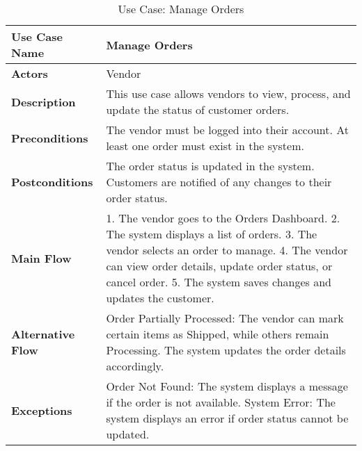 \begin{table}[h]
\centering
\begin{tabular}{|p{3cm}|p{10cm}|}
\hline
\textbf{Use Case Name} & Manage Orders \\
\hline
\textbf{Actors} & Vendor \\
\hline
\textbf{Description} & This use case allows vendors to view, process, and update the status of customer orders. \\
\hline
\textbf{Preconditions} & The vendor must be logged into their account. At least one order must exist in the system. \\
\hline
\textbf{Postconditions} & The order status is updated in the system. Customers are notified of any changes to their order status. \\
\hline
\textbf{Main Flow} & 1. The vendor goes to the Orders Dashboard. 2. The system displays a list of orders. 3. The vendor selects an order to manage. 4. The vendor can view order details, update order status, or cancel order. 5. The system saves changes and updates the customer. \\
\hline
\textbf{Alternative Flow} & Order Partially Processed: The vendor can mark certain items as Shipped, while others remain Processing. The system updates the order details accordingly. \\
\hline
\textbf{Exceptions} & Order Not Found: The system displays a message if the order is not available. System Error: The system displays an error if order status cannot be updated. \\
\hline
\end{tabular}
\caption{Use Case: Manage Orders}
\end{table}

